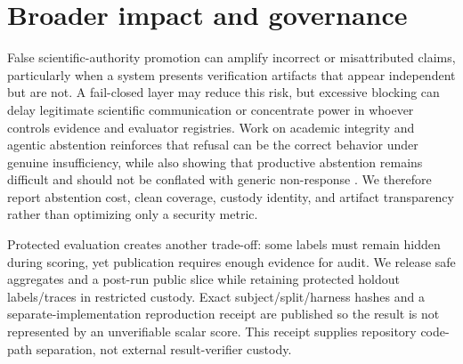 \section{Broader impact and governance}
False scientific-authority promotion can amplify incorrect or misattributed claims, particularly when a system presents verification artifacts that appear independent but are not. A fail-closed layer may reduce this risk, but excessive blocking can delay legitimate scientific communication or concentrate power in whoever controls evidence and evaluator registries. Work on academic integrity and agentic abstention reinforces that refusal can be the correct behavior under genuine insufficiency, while also showing that productive abstention remains difficult and should not be conflated with generic non-response \citep{sciintegrity2026,agentabstain2026}. We therefore report abstention cost, clean coverage, custody identity, and artifact transparency rather than optimizing only a security metric.

Protected evaluation creates another trade-off: some labels must remain hidden during scoring, yet publication requires enough evidence for audit. We release safe aggregates and a post-run public slice while retaining protected holdout labels/traces in restricted custody. Exact subject/split/harness hashes and a separate-implementation reproduction receipt are published so the result is not represented by an unverifiable scalar score. This receipt supplies repository code-path separation, not external result-verifier custody.
